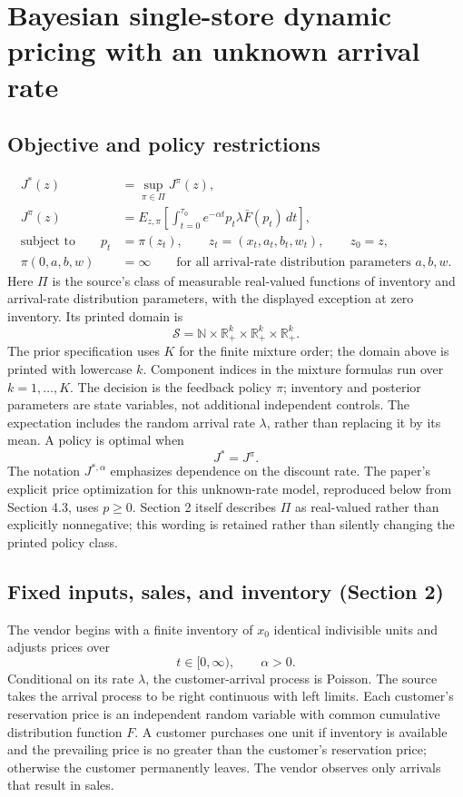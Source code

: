 \documentclass{article}
\begin{document}
\section*{Bayesian single-store dynamic pricing with an unknown arrival rate}

\subsection*{Objective and policy restrictions}
\begin{align*}
J^*(z)&=\sup_{\pi\in\Pi}J^\pi(z),\\
J^\pi(z)&=E_{z,\pi}\left[\int_{t=0}^{\tau_0}e^{-\alpha t}p_t\lambda\bar F(p_t)\,dt\right],\\
\text{subject to}\qquad
p_t&=\pi(z_t),\qquad z_t=(x_t,a_t,b_t,w_t),\qquad z_0=z,\\
\pi(0,a,b,w)&=\infty\qquad\text{for all arrival-rate distribution parameters }a,b,w.
\end{align*}
Here \(\Pi\) is the source's class of measurable real-valued functions of inventory and arrival-rate distribution parameters, with the displayed exception at zero inventory. Its printed domain is
\[
\mathcal S=\mathbb N\times\mathbb R_+^k\times\mathbb R_+^k\times\mathbb R_+^k.
\]
The prior specification uses \(K\) for the finite mixture order; the domain above is printed with lowercase \(k\). Component indices in the mixture formulas run over \(k=1,\ldots,K\). The decision is the feedback policy \(\pi\); inventory and posterior parameters are state variables, not additional independent controls. The expectation includes the random arrival rate \(\lambda\), rather than replacing it by its mean. A policy is optimal when
\[
J^*=J^\pi.
\]
The notation \(J^{*,\alpha}\) emphasizes dependence on the discount rate. The paper's explicit price optimization for this unknown-rate model, reproduced below from Section 4.3, uses \(p\geq0\). Section 2 itself describes \(\Pi\) as real-valued rather than explicitly nonnegative; this wording is retained rather than silently changing the printed policy class.

\subsection*{Fixed inputs, sales, and inventory (Section 2)}
The vendor begins with a finite inventory of \(x_0\) identical indivisible units and adjusts prices over
\[
t\in[0,\infty),\qquad \alpha>0.
\]
Conditional on its rate \(\lambda\), the customer-arrival process is Poisson. The source takes the arrival process to be right continuous with left limits. Each customer's reservation price is an independent random variable with common cumulative distribution function \(F\). A customer purchases one unit if inventory is available and the prevailing price is no greater than the customer's reservation price; otherwise the customer permanently leaves. The vendor observes only arrivals that result in sales.
\end{document}

